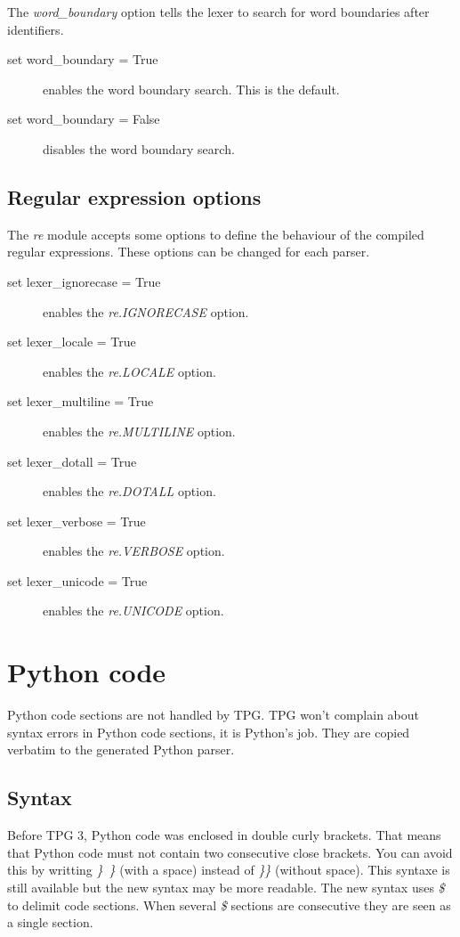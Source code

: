 The \emph{word\_boundary} option tells the lexer to search for word boundaries after identifiers.

\begin{description}
    \item [set word\_boundary = True] enables the word boundary search. This is the default.
    \item [set word\_boundary = False] disables the word boundary search.
\end{description}

\subsection{Regular expression options}

The \emph{re} module accepts some options to define the behaviour of the compiled regular expressions.
These options can be changed for each parser.

\begin{description}
    \item [set lexer\_ignorecase = True] enables the \emph{re.IGNORECASE} option.
    \item [set lexer\_locale = True] enables the \emph{re.LOCALE} option.
    \item [set lexer\_multiline = True] enables the \emph{re.MULTILINE} option.
    \item [set lexer\_dotall = True] enables the \emph{re.DOTALL} option.
    \item [set lexer\_verbose = True] enables the \emph{re.VERBOSE} option.
    \item [set lexer\_unicode = True] enables the \emph{re.UNICODE} option.
\end{description}

\section{Python code}                                       \label{grammar:code}

Python code sections are not handled by TPG.
TPG won't complain about syntax errors in Python code sections, it is Python's job.
They are copied verbatim to the generated Python parser.

\subsection{Syntax}

Before TPG 3, Python code was enclosed in double curly brackets.
That means that Python code must not contain two consecutive close brackets.
You can avoid this by writting \emph{\}~\}} (with a space) instead of \emph{\}\}} (without space).
This syntaxe is still available but the new syntax may be more readable.
The new syntax uses \emph{\$} to delimit code sections.
When several \emph{\$} sections are consecutive they are seen as a single section.

